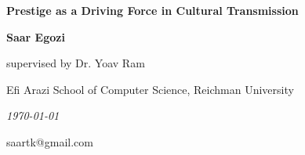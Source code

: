 \documentclass[11pt]{article}
\author{
	Saar Egozi
	\and
	Yoav Ram
}
\begin{document}
\begin{titlepage}
\centering

\vspace{4cm}

{\LARGE\bfseries Prestige as a Driving Force in Cultural Transmission}

\vspace{2cm}

{\large\bfseries Saar Egozi}

\vspace{1cm}

{\large supervised by Dr. Yoav Ram}

\vspace{2cm}

\vfill

{\large Efi Arazi School of Computer Science, Reichman University}

\vspace{1cm}

{\itshape \today}

{\large saartk@gmail.com}
\end{titlepage}


\renewcommand\linenumberfont{\normalfont\small\sffamily}
\linenumbers
\modulolinenumbers[2]
\setcounter{secnumdepth}{0}
\tableofcontents

\clearpage
\end{document}
